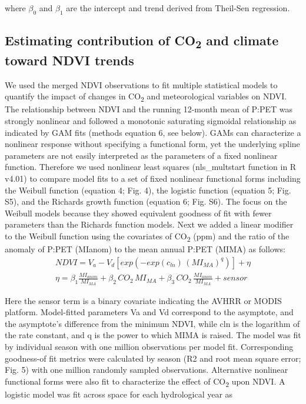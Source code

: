 \documentclass[gc, manuscript]{copernicus}
\begin{document}
where \(\beta_0\) and \(\beta_1\) are the intercept and trend derived
from Theil-Sen regression.

\subsection{\texorpdfstring{Estimating contribution of
CO\textsubscript{2} and climate toward NDVI
trends}{Estimating contribution of CO2 and climate toward NDVI trends}}

We used the merged NDVI observations to fit multiple statistical models
to quantify the impact of changes in CO\textsubscript{2} and
meteorological variables on NDVI. The relationship between NDVI and the
running 12-month mean of P:PET was strongly nonlinear and followed a
monotonic saturating sigmoidal relationship as indicated by GAM fits
(methods equation 6, see below). GAMs can characterize a nonlinear
response without specifying a functional form, yet the underlying spline
parameters are not easily interpreted as the parameters of a fixed
nonlinear function. Therefore we used nonlinear least squares
(nls\_multstart function \citep{padfield_matheson20} in R v4.01) to
compare model fits to a set of fixed nonlinear functional forms
including the Weibull function (equation 4; Fig. 4), the logistic
function (equation 5; Fig. S5), and the Richards growth function
(equation 6; Fig. S6). The focus on the Weibull models because they
showed equivalent goodness of fit with fewer parameters than the
Richards function models. Next we added a linear modifier to the Weibull
function using the covariates of CO\textsubscript{2} (ppm) and the ratio
of the anomaly of P:PET (MIanom) to the mean annual P:PET (MIMA) as
follows: \begin{align}
NDVI=V_a-V_d[exp(-exp(c_{ln})\,(MI_{MA})^{q})]+\eta\\
\eta = \beta_{1}\frac{MI_{anom}}{MI_{MA}}+\beta_{2}\,CO_2\,MI_{MA} +\beta_{3}\,CO_2\,\frac{MI_{anom}}{MI_{MA}}+sensor\nonumber
\end{align}

Here the sensor term is a binary covariate indicating the AVHRR or MODIS
platform. Model-fitted parameters Va and Vd correspond to the asymptote,
and the asymptote's difference from the minimum NDVI, while cln is the
logarithm of the rate constant, and q is the power to which MIMA is
raised. The model was fit by individual season with one million
observations per model fit. Corresponding goodness-of fit metrics were
calculated by season (R2 and root mean square error; Fig. 5) with one
million randomly sampled observations. Alternative nonlinear functional
forms were also fit to characterize the effect of CO\textsubscript{2}
upon NDVI. A logistic model was fit across space for each hydrological
year as
\end{document}

